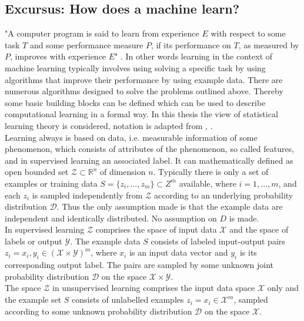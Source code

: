 \begin{tcolorbox}
    \subsection*{Excursus: How does a machine learn?}
    "A computer program is said to learn from experience $E$ with respect to some task $T$ and some performance measure $P$, if its performance on $T$, as measured by $P$, improves with experience $E$" \cite{Mitchell1997}. In other words learning in the context of machine learning typically involves using solving a specific task by using algorithms that improve their performance by using example data. There are numerous algorithms designed to solve the problems outlined above. Thereby some basic building blocks can be defined which can be used to describe computational learning in a formal way. In this thesis the view of statistical learning theory is considered, notation is adapted from \citeauthor{Shalev2014}\cite{Shalev2014}, \citeauthor{Von_luxburg2011}\cite{Von_luxburg2011}.\\
    Learning always is based on data, i.e. measurable information of some phenomenon, which consists of attributes of the phenomenon, so called features, and in supervised learning an associated label. It can mathematically defined as open bounded set $\mathcal{Z}\subset\mathbb{R}^n$ of dimension $n$. Typically there is only a set of examples or training data $S=\{z_i,...,z_m\}\subset{Z}^m$ available, where $i = 1,\dots,m$, and each $z_i$ is sampled independently from $\mathcal{Z}$ according to an underlying probability distribution $\mathcal{D}$. Thus the only assumption made is that the example data are independent and identically distributed. No assumption on $D$ is made.\\
    In supervised learning $\mathcal{Z}$ comprises the space of input data $\mathcal{X}$ and the space of labels or output $\mathcal{Y}$. The example data $S$ consists of labeled input-output pairs $z_i=x_i,y_i\in(\mathcal{X}\times\mathcal{Y})^m$, where $x_i$ is an input data vector and $y_i$ is its corresponding output label. The pairs are sampled by some unknown joint probability distribution $\mathcal{D}$ on the space $\mathcal{X}\times\mathcal{Y}$.\\
    The space $\mathcal{Z}$ in unsupervised learning comprises the input data space $\mathcal{X}$ only and the example set $S$ consists of unlabelled examples $z_i=x_i\in\mathcal{X}^m$, sampled according to some unknown probability distribution $\mathcal{D}$ on the space $\mathcal{X}$.\\

\end{tcolorbox}
